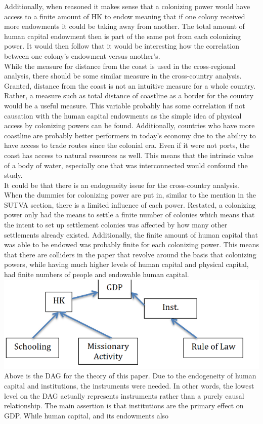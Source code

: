 \documentclass[12pt]{article}
\begin{document}
{Additionally, when reasoned it makes sense that a colonizing power would have access to a finite amount of HK to endow meaning that if one colony received more endowments it could be taking away from another. The total amount of human capital endowment then is part of the same pot from each colonizing power. It would then follow that it would be interesting how the correlation between one colony's endowment versus another's.\\


While the measure for distance from the coast is used in the cross-regional analysis, there should be some similar measure in the cross-country analysis. Granted, distance from the coast is not an intuitive measure for a whole country. Rather, a measure such as total distance of coastline as a border for the country would be a useful measure. This variable probably has some correlation if not causation with the human capital endowments as the simple idea of physical access by colonizing powers can be found. Additionally, countries who have more coastline are probably better performers in today's economy due to the ability to have access to trade routes since the colonial era. Even if it were not ports, the coast has access to natural resources as well. This means that the intrinsic value of a body of water, especially one that was interconnected would confound the study.\\
 
It could be that there is an endogeneity issue for the cross-country analysis. When the dummies for colonizing power are put in, similar to the mention in the SUTVA section, there is a limited influence of each power. Restated, a colonizing power only had the means to settle a finite number of colonies which means that the intent to set up settlement colonies was affected by how many other settlements already existed. Additionally, the finite amount of human capital that was able to be endowed was probably finite for each colonizing power. This means that there are colliders in the paper that revolve around the basis that colonizing powers, while having much higher levels of human capital and physical capital, had finite numbers of people and endowable human capital. \\

\includegraphics[scale = 1.25]{DAG}
Above is the DAG for the theory of this paper. Due to the endogeneity of human capital and institutions, the instruments were needed. In other words, the lowest level on the DAG actually represents instruments rather than a purely causal relationship. The main assertion is that institutions are the primary effect on GDP. While human capital, and its endowments also \\

}
\end{document}
